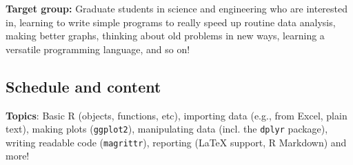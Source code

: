 \documentclass[a4paper,12pt]{article}
\begin{document}

\textbf{Target group:} Graduate students in science and engineering who are interested in, learning to write simple programs to really speed up routine data analysis, making better graphs, thinking about old problems in new ways, learning a versatile programming language, and so on!\\




\begin{center}

\end{center}


\subsection*{Schedule and content}

\textbf{Topics}: Basic R (objects, functions, etc), importing data (e.g., from Excel, plain text), making plots (\texttt{ggplot2}), manipulating data (incl. the \texttt{dplyr} package), writing readable code (\texttt{magrittr}), reporting (\LaTeX{} support, R Markdown) and more!
\end{document}
